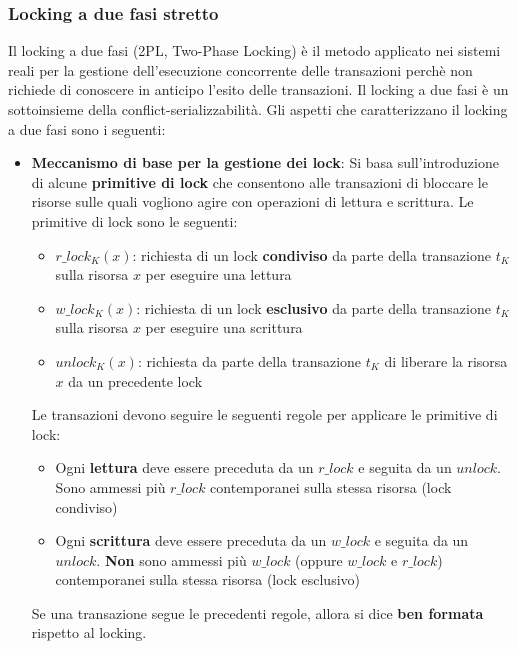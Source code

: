 \documentclass[a4paper]{article}
\begin{document}
 
\subsubsection{Locking a due fasi stretto}
Il locking a due fasi (2PL, Two-Phase Locking) è il metodo applicato nei sistemi reali
per la gestione dell'esecuzione concorrente delle transazioni perchè non richiede di
conoscere in anticipo l'esito delle transazioni. Il locking a due fasi è un sottoinsieme
della conflict-serializzabilità.
Gli aspetti che caratterizzano il locking a due fasi sono i seguenti:
\begin{itemize}
  \item \textbf{Meccanismo di base per la gestione dei lock}:
    Si basa sull'introduzione di alcune \textbf{primitive di lock} che consentono
    alle transazioni di bloccare le risorse sulle quali vogliono agire con operazioni
    di lettura e scrittura. Le primitive di lock sono le seguenti:
    \begin{itemize}
      \item \( r\_lock_K(x) \): richiesta di un lock \textbf{condiviso} da parte della
        transazione \( t_K \) sulla risorsa \( x \) per eseguire una lettura

      \item \( w\_lock_K(x) \): richiesta di un lock \textbf{esclusivo} da parte della
        transazione \( t_K \) sulla risorsa \( x \) per eseguire una scrittura

      \item \( unlock_K(x) \): richiesta da parte della transazione \( t_K \) di
        liberare la risorsa \( x \) da un precedente lock
    \end{itemize}
    Le transazioni devono seguire le seguenti regole per applicare le primitive di
    lock:
    \begin{itemize}
      \item Ogni \textbf{lettura} deve essere preceduta da un \( r\_lock \) e seguita
        da un \( unlock \). Sono ammessi più \( r\_lock \) contemporanei sulla stessa
        risorsa (lock condiviso)

      \item Ogni \textbf{scrittura} deve essere preceduta da un \( w\_lock \) e seguita
        da un \( unlock \). \textbf{Non} sono ammessi più \( w\_lock \) (oppure
        \( w\_lock \) e \( r\_lock \)) contemporanei sulla stessa risorsa (lock
        esclusivo)
    \end{itemize}
    Se una transazione segue le precedenti regole, allora si dice \textbf{ben formata}
    rispetto al locking.


\end{itemize}
\end{document}

